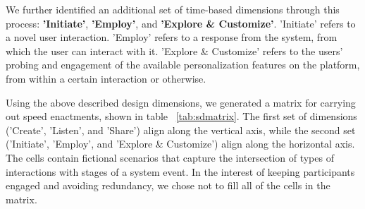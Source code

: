 {We further identified an additional set of time-based dimensions through this process: \textbf{'Initiate'}, \textbf{'Employ'}, and \textbf{'Explore \& Customize'}. 'Initiate' refers to a novel user interaction. 'Employ' refers to a response from the system, from which the user can interact with it. 'Explore \& Customize' refers to the users' probing and engagement of the available personalization features on the platform, from within a certain interaction or otherwise.

Using the above described design dimensions, we generated a matrix for carrying out speed enactments, shown in table ~\ref{tab:sdmatrix}. The first set of dimensions ('Create', 'Listen', and 'Share') align along the vertical axis, while the second set ('Initiate', 'Employ', and 'Explore \& Customize') align along the horizontal axis. The cells contain fictional scenarios that capture the intersection of types of interactions with stages of a system event. In the interest of keeping participants engaged and avoiding redundancy, we chose not to fill all of the cells in the matrix. 

}
